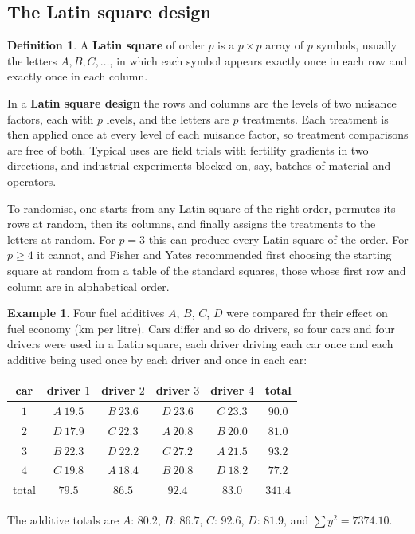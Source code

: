 \documentclass[11pt,a4paper]{article}
\numberwithin{equation}{section}
\theoremstyle{definition}
\newtheorem{defn}[thm]{Definition}
\newtheorem{exa}[thm]{Example}
\begin{document}
\subsection{The Latin square design}
\begin{defn}
A \textbf{Latin square} of order $p$ is a $p \times p$ array of $p$ symbols, usually the letters $A, B, C, \dots$, in which each symbol appears exactly once in each
row and exactly once in each column.
\end{defn}

In a \textbf{Latin square design} the rows and columns are the levels of two nuisance factors, each with $p$ levels, and the letters are $p$ treatments.
Each treatment is then applied once at every level of each nuisance factor, so treatment comparisons are free of both. Typical uses are field
trials with fertility gradients in two directions, and industrial experiments blocked on, say, batches of material and operators.

To randomise, one starts from any Latin square of the right order, permutes its rows at random, then its columns, and finally assigns the
treatments to the letters at random. For $p = 3$ this can produce every Latin square of the order. For $p \ge 4$ it cannot, and Fisher and Yates recommended first choosing
the starting square at random from a table of the standard squares, those whose first row and column are in alphabetical order.

\begin{exa}\label{exa:fuel}
Four fuel additives $A$, $B$, $C$, $D$ were compared for their effect on fuel economy (km per litre). Cars differ and so do drivers, so four cars
and four drivers were used in a Latin square, each driver driving each car once and each additive being used once by each driver and once in
each car:
\begin{center}
\begin{tabular}{c|cccc|c}
car & driver $1$ & driver $2$ & driver $3$ & driver $4$ & total \\
\hline
$1$ & $A\ 19.5$ & $B\ 23.6$ & $D\ 23.6$ & $C\ 23.3$ & $90.0$ \\
$2$ & $D\ 17.9$ & $C\ 22.3$ & $A\ 20.8$ & $B\ 20.0$ & $81.0$ \\
$3$ & $B\ 22.3$ & $D\ 22.2$ & $C\ 27.2$ & $A\ 21.5$ & $93.2$ \\
$4$ & $C\ 19.8$ & $A\ 18.4$ & $B\ 20.8$ & $D\ 18.2$ & $77.2$ \\
\hline
total & $79.5$ & $86.5$ & $92.4$ & $83.0$ & $341.4$
\end{tabular}
\end{center}
The additive totals are $A$: $80.2$, $B$: $86.7$, $C$: $92.6$, $D$: $81.9$, and $\sum y^2 = 7374.10$.
\end{exa}
\end{document}
